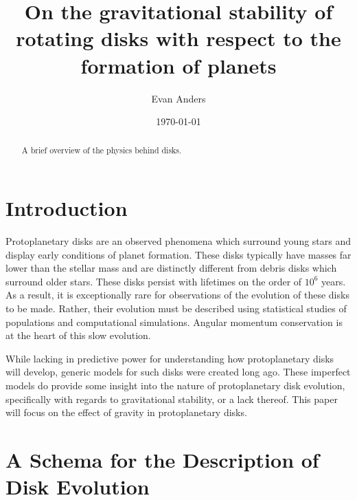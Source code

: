 \documentclass[aps,pra,twocolumn]{revtex4-1}
\begin{document}
\title{On the gravitational stability of rotating disks with respect to the formation of planets}

\author{Evan Anders}


\date{\today}

\begin{abstract}
A brief overview of the physics behind disks.
\end{abstract}



\maketitle


\section{\label{section1} Introduction}

Protoplanetary disks are an observed phenomena which surround young stars and display early conditions of planet formation.  These disks typically have masses far lower than the stellar mass and are distinctly different from debris disks which surround older stars.  These disks persist with lifetimes on the order of $10^6$ years.  As a result, it is exceptionally rare for observations of the evolution of these disks to be made.  Rather, their evolution must be described using statistical studies of populations and computational simulations.  Angular momentum conservation is at the heart of this slow evolution.   \cite{armitage2011}

While lacking in predictive power for understanding how protoplanetary disks will develop, generic models for such disks were created long ago.  These imperfect models do provide some insight into the nature of protoplanetary disk evolution, specifically with regards to gravitational stability, or a lack thereof.  This paper will focus on the effect of gravity in protoplanetary disks.



\section{\label{section 2} A Schema for the Description of Disk Evolution}
\end{document}
